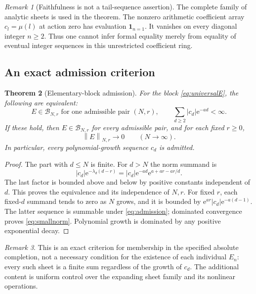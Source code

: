 \documentclass[11pt,a4paper]{article}
\numberwithin{equation}{section}
\newtheorem{theorem}{Theorem}[section]
\theoremstyle{definition}
\theoremstyle{remark}
\newtheorem{remark}[theorem]{Remark}
\newcommand{\B}{\mathcal B}
\newcommand{\ee}{\mathrm e}
\newcommand{\ind}{\mathbf 1}
\newcommand{\norm}[1]{\left\|#1\right\|}
\begin{document}
\begin{remark}[Faithfulness is not a tail-sequence assertion]
The complete family of analytic sheets is used in the theorem. The
nonzero arithmetic coefficient array $c_l=\mu(l)$ at action zero has
evaluation $\ind_{n=1}$. It vanishes on every diagonal integer $n\ge2$.
Thus one cannot infer formal equality merely from equality of eventual
integer sequences in this unrestricted coefficient ring.
\end{remark}

\subsection{An exact admission criterion}

\begin{theorem}[Elementary-block admission]\label{thm:admission}
For the block \eqref{eq:universalE}, the following are equivalent:
\begin{equation}
 E\in\B_{N,r}\text{ for one admissible pair }(N,r),
 \qquad
 \sum_{d\ge2}|c_d|\ee^{-ad}<\infty.
 \label{eq:admission}
\end{equation}
If these hold, then $E\in\B_{N,r}$ for every admissible pair, and for
each fixed $r\ge0$,
\begin{equation}
 \norm{E}_{N,r}\longrightarrow0\qquad(N\longrightarrow\infty).
 \label{eq:smallnorm}
\end{equation}
In particular, every polynomial-growth sequence $c_d$ is admitted.
\end{theorem}
\begin{proof}
The part with $d\le N$ is finite. For $d>N$ the norm summand is
\begin{equation}
 |c_d|\ee^{-\lambda_d(d-r)}
 =|c_d|\ee^{-ad}\ee^{a+ar-ar/d}.
 \label{eq:tailweight}
\end{equation}
The last factor is bounded above and below by positive constants
independent of $d$. This proves the equivalence and its independence of
$N,r$. For fixed $r$, each fixed-$d$ summand tends to zero as $N$ grows,
and it is bounded by $\ee^{ar}|c_d|\ee^{-a(d-1)}$. The latter sequence
is summable under \eqref{eq:admission}; dominated convergence proves
\eqref{eq:smallnorm}. Polynomial growth is dominated by any positive
exponential decay.
\end{proof}

\begin{remark}
This is an exact criterion for membership in the specified absolute
completion, not a necessary condition for the existence of each
individual $E_n$: every such sheet is a finite sum regardless of the
growth of $c_d$. The additional content is uniform control over the
expanding sheet family and its nonlinear operations.
\end{remark}
\end{document}
